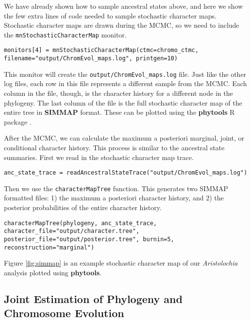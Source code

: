 We have already shown how to sample ancestral states above, and here we show
the few extra lines of \Rev code needed to sample stochastic character maps.
Stochastic character maps are drawn during the MCMC, so we need to include the
\texttt{mnStochasticCharacterMap} monitor.
{\tt \begin{snugshade*}
\begin{lstlisting}
monitors[4] = mnStochasticCharacterMap(ctmc=chromo_ctmc, filename="output/ChromEvol_maps.log", printgen=10)
\end{lstlisting}
\end{snugshade*}}
This monitor will create the \texttt{output/ChromEvol\_maps.log} file.
Just like the other log files, each row in this file represents a different sample from the MCMC.
Each column in the file, though, is the character history for a different node in the phylogeny.
The last column of the file is the full stochastic character map of the entire tree
in \textbf{SIMMAP} \citep{bollback2006simmap} format.
These can be plotted using the \textbf{phytools} R package \citep{revell2012phytools}.

After the MCMC, we can calculate the maximum a posteriori marginal, joint, or conditional
character history. This process is similar to the ancestral state summaries.
First we read in the stochastic character map trace.
{\tt \begin{snugshade*}
\begin{lstlisting}
anc_state_trace = readAncestralStateTrace("output/ChromEvol_maps.log")
\end{lstlisting}
\end{snugshade*}}
Then we use the \texttt{characterMapTree} function. This generates two SIMMAP formatted files:
1) the maximum a posteriori character history, and 2) the posterior probabilities of the
entire character history.
{\tt \begin{snugshade*}
\begin{lstlisting}
characterMapTree(phylogeny, anc_state_trace, character_file="output/character.tree", posterior_file="output/posterior.tree", burnin=5, reconstruction="marginal")
\end{lstlisting}
\end{snugshade*}}
Figure \ref{fig:simmap} is an example stochastic character map of our \textit{Aristolochia} analysis plotted using \textbf{phytools}. 

\medskip
\subsection{Joint Estimation of Phylogeny and Chromosome Evolution}\label{subsect:joint_estimation}


